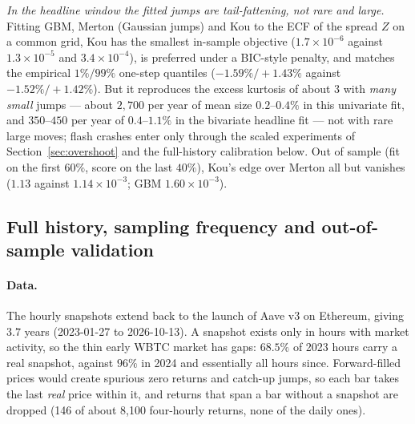 \documentclass[11pt]{article}
\theoremstyle{plain}
\theoremstyle{definition}
\theoremstyle{remark}
\begin{document}
\emph{In the headline window the fitted jumps are tail-fattening, not rare and large.} Fitting GBM,
Merton (Gaussian jumps)
and Kou to the ECF of the spread $Z$ on a common grid, Kou has the smallest in-sample objective
($1.7\times10^{-6}$ against $1.3\times10^{-5}$ and $3.4\times10^{-4}$), is preferred under a
BIC-style penalty, and matches the empirical $1\%/99\%$ one-step quantiles ($-1.59\%/{+}1.43\%$
against $-1.52\%/{+}1.42\%$). But it reproduces the excess kurtosis of about $3$ with \emph{many
small} jumps --- about $2{,}700$ per year of mean size $0.2$--$0.4\%$ in this univariate fit, and
$350$--$450$ per year of $0.4$--$1.1\%$ in the bivariate headline fit --- not with rare large moves; flash
crashes enter only through the scaled experiments of Section~\ref{sec:overshoot} and the
full-history calibration below. Out of sample (fit on the first $60\%$, score on the last $40\%$),
Kou's edge over Merton all but vanishes ($1.13$ against $1.14\times10^{-3}$; GBM
$1.60\times10^{-3}$).

\subsection{Full history, sampling frequency and out-of-sample validation}\label{sec:full-history}

\paragraph{Data.} The hourly snapshots extend back to the launch of Aave v3 on Ethereum, giving
$3.7$ years (2023-01-27 to 2026-10-13). A snapshot exists only in hours with market activity, so
the thin early WBTC market has gaps: $68.5\%$ of 2023 hours carry a real snapshot, against $96\%$ in
2024 and essentially all hours since. Forward-filled prices would create spurious zero returns and
catch-up jumps, so each bar takes the last \emph{real} price within it, and returns that span a bar
without a snapshot are dropped (146 of about 8{,}100 four-hourly returns, none of the daily ones).
\end{document}
